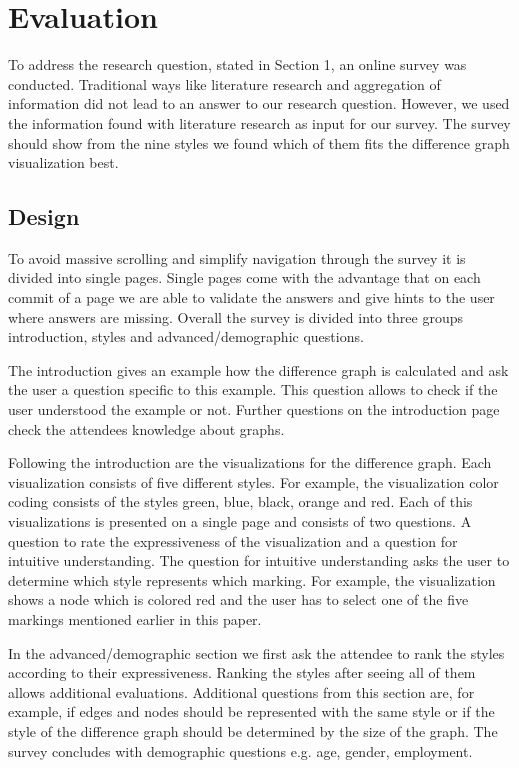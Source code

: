 \documentclass{llncs}
\begin{document}
\section{Evaluation} %
\label{sec:Evaluation} %
To address the research question, stated in Section 1, an online survey was conducted. Traditional ways like literature research and aggregation of information did not lead to an answer to our research question. However, we used the information found with literature research as input for our survey. The survey should show from the nine styles we found which of them fits the difference graph visualization best.


\subsection{Design} %
\label{sec:Design}
To avoid massive scrolling and simplify navigation through the survey it is divided into single pages. Single pages come with the advantage that on each commit of a page we are able to validate the answers and give hints to the user where answers are missing. Overall the survey is divided into three groups introduction, styles and advanced/demographic questions.

The introduction gives an example how the difference graph is calculated and ask the user a question specific to this example. This question allows to check if the user understood the example or not. Further questions on the introduction page check the attendees knowledge about graphs.

Following the introduction are the visualizations for the difference graph. Each visualization consists of five different styles. For example, the visualization color coding consists of the styles green, blue, black, orange and red. Each of this visualizations is presented on a single page and consists of two questions. A question to rate the expressiveness of the visualization and a question for intuitive understanding. The question for intuitive understanding asks the user to determine which style represents which marking. For example, the visualization shows a node which is colored red and the user has to select one of the five markings mentioned earlier in this paper.

In the advanced/demographic section we first ask the attendee to rank the styles according to their expressiveness. Ranking the styles after seeing all of them allows additional evaluations. Additional questions from this section are, for example, if edges and nodes should be represented with the same style or if the style of the difference graph should be determined by the size of the graph. The survey concludes with demographic questions e.g. age, gender, employment.
\end{document}

